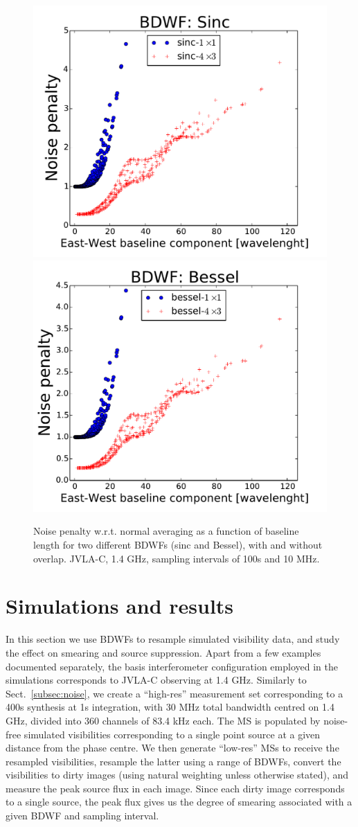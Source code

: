 \documentclass[useAMS,usenatbib]{mn2e}
\newcommand{\OMS}[1]{\textcolor{red}{{\bf OMS: #1}}}
\begin{document}
\begin{figure}
\includegraphics[width=.4\textwidth]{./Figures/per-baseline-noise-ratio-sinc.pdf}%
\includegraphics[width=.4\textwidth]{./Figures/per-baseline-noise-ratio-bessel.pdf}
\caption{Noise penalty w.r.t. normal averaging as a function of baseline length for two different BDWFs 
(sinc and Bessel), with and without overlap. JVLA-C, 1.4 GHz, sampling intervals of 100s and 
10 MHz. 
}
\label{fig:per-baseline-noise}
\end{figure}

\section{Simulations and results}

\newcommand{\BIN}[2]{#1s$\times$#2MHz}

In this section we use BDWFs to resample simulated visibility data, and study the effect on smearing and source 
suppression. Apart from a few examples documented separately, the basis interferometer configuration employed in 
the simulations corresponds to JVLA-C observing at 1.4 GHz. Similarly to Sect.~\ref{subsec:noise}, we create a 
``high-res'' measurement set corresponding to a 400s synthesis at 1s integration, with 30 MHz total bandwidth
centred on 1.4 GHz, divided into 360 channels of 83.4 kHz each.
The MS is populated by noise-free simulated visibilities corresponding to a single point source at 
a given distance from the phase centre. We then generate ``low-res'' MSs to receive the resampled visibilities,
resample the latter using a range of BDWFs, convert the visibilities to dirty images (using natural weighting
unless otherwise stated), and measure the peak source flux in each image. Since each dirty image corresponds to 
a single source, the peak flux gives us the degree of smearing associated with a given BDWF and sampling interval.
\end{document}

